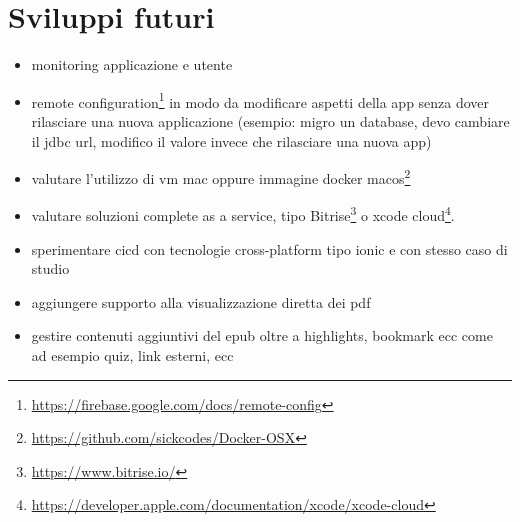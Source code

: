 

\section{Sviluppi futuri}
\begin{itemize}
    \item monitoring applicazione e utente
    \item remote configuration\footnote{\url{https://firebase.google.com/docs/remote-config}} in modo da modificare aspetti della app senza dover rilasciare una nuova applicazione (esempio: migro un database, devo cambiare il jdbc url, modifico il valore invece che rilasciare una nuova app)
    \item valutare l'utilizzo di vm mac oppure immagine docker macos\footnote{\url{https://github.com/sickcodes/Docker-OSX}}
    \item valutare soluzioni complete as a service, tipo Bitrise\footnote{\url{https://www.bitrise.io/}} o xcode cloud\footnote{\url{https://developer.apple.com/documentation/xcode/xcode-cloud}}.
    \item sperimentare cicd con tecnologie cross-platform tipo ionic e con stesso caso di studio
    \item aggiungere supporto alla visualizzazione diretta dei pdf
    \item gestire contenuti aggiuntivi del epub oltre a highlights, bookmark ecc come ad esempio quiz, link esterni, ecc
\end{itemize}
